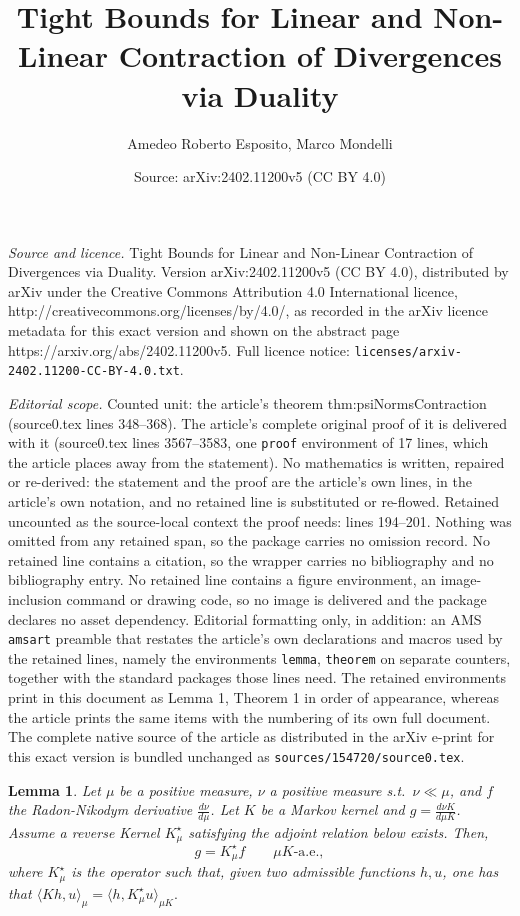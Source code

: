 \documentclass[10pt,a4paper]{amsart}
\title{Tight Bounds for Linear and Non-Linear Contraction of Divergences via Duality}
\author{Amedeo Roberto Esposito, Marco Mondelli}
\date{Source: arXiv:2402.11200v5 (CC BY 4.0)}
\newtheorem{lemma}{Lemma}
\begin{document}
\maketitle

\noindent\emph{Source and licence.} Tight Bounds for Linear and Non-Linear Contraction of Divergences via Duality. Version arXiv:2402.11200v5 (CC BY 4.0), distributed by arXiv under the Creative Commons Attribution 4.0 International licence, http://creativecommons.org/licenses/by/4.0/, as recorded in the arXiv licence metadata for this exact version and shown on the abstract page https://arxiv.org/abs/2402.11200v5. Full licence notice: \texttt{licenses/arxiv-2402.11200-CC-BY-4.0.txt}.\par\smallskip

\noindent\textit{Editorial scope.} Counted unit: the article's theorem thm:psiNormsContraction (source0.tex lines 348--368). The article's complete original proof of it is delivered with it (source0.tex lines 3567--3583, one \texttt{proof} environment of 17 lines, which the article places away from the statement). No mathematics is written, repaired or re-derived: the statement and the proof are the article's own lines, in the article's own notation, and no retained line is substituted or re-flowed.  Retained uncounted as the source-local context the proof needs: lines 194--201.  Nothing was omitted from any retained span, so the package carries no omission record.  No retained line contains a citation, so the wrapper carries no bibliography and no bibliography entry.  No retained line contains a figure environment, an image-inclusion command or drawing code, so no image is delivered and the package declares no asset dependency.  Editorial formatting only, in addition: an AMS \texttt{amsart} preamble that restates the article's own declarations and macros used by the retained lines, namely the environments \texttt{lemma}, \texttt{theorem} on separate counters, together with the standard packages those lines need.  The retained environments print in this document as Lemma 1, Theorem 1 in order of appearance, whereas the article prints the same items with the numbering of its own full document.  The complete native source of the article as distributed in the arXiv e-print for this exact version is bundled unchanged as \texttt{sources/154720/source0.tex}.
\begin{lemma}\label{lem:kStarRND}
    Let $\mu$ be a positive measure, $\nu$ a positive measure s.t.\ $\nu\ll\mu$, and $f$ the Radon-Nikodym derivative   $\frac{d\nu}{d\mu}$. Let $K$ be a Markov kernel and $g=\frac{d\nu K}{d\mu K}$. Assume a reverse Kernel $K_\mu^\star$ satisfying the adjoint relation below exists. Then, %
  \begin{equation}
        g = K_\mu^\star f\hspace{2em} \mu K\text{-a.e.},
    \end{equation}
    where $K_\mu^\star$ is the operator such that, given two admissible functions $h,u$, one has that
    $\langle Kh, u \rangle_\mu = \langle h, K_\mu^\star u\rangle_{\mu K}.$
    \end{lemma}
\end{document}
